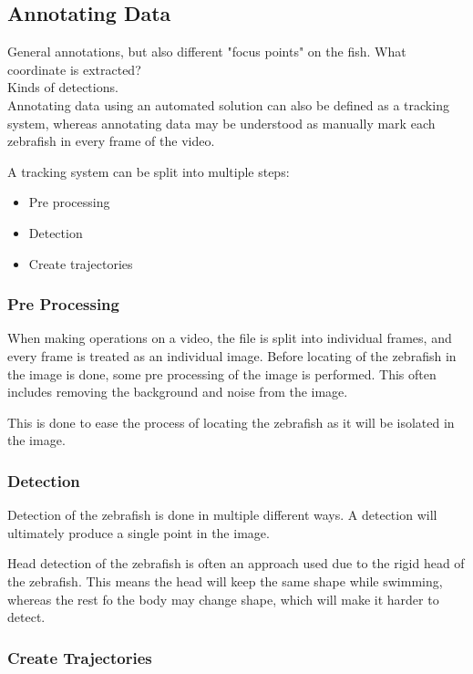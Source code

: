 \subsection{Annotating Data}
General annotations, but also different "focus points" on the fish. What coordinate is extracted?\\
Kinds of detections.\\

Annotating data using an automated solution can also be defined as a tracking system, whereas annotating data may be understood as manually mark each zebrafish in every frame of the video. 

A tracking system can be split into multiple steps:

\begin{itemize}
	\item Pre processing
	\item Detection
	\item Create trajectories
\end{itemize}

\subsubsection{Pre Processing}
When making operations on a video, the file is split into individual frames, and every frame is treated as an individual image. Before locating of the zebrafish in the image is done, some pre processing of the image is performed. This often includes removing the background and noise from the image.

This is done to ease the process of locating the zebrafish as it will be isolated in the image.

\subsubsection{Detection}
Detection of the zebrafish is done in multiple different ways. A detection will ultimately produce a single point in the image.

Head detection of the zebrafish is often an approach used due to the rigid head of the zebrafish. This means the head will keep the same shape while swimming, whereas the rest fo the body may change shape, which will make it harder to detect.

\subsubsection{Create Trajectories}

